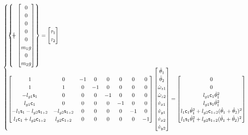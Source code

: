 \documentclass[a4paper,11pt,brazil,fleqn]{article}
\begin{document}
\begin{equation}
\begin{cases}
\begin{Bmatrix}
\begin{bmatrix}
\end{bmatrix}
+
\begin{bmatrix}
0 \\
0 \\
0 \\
0 \\
0 \\
m_1 g \\
0 \\
m_2 g
\end{bmatrix}
\end{Bmatrix}
=
\begin{bmatrix}
\tau_1 \\ \tau_2
\end{bmatrix} \\
\begin{bmatrix}
1 & 0 & -1 & 0 & 0 & 0 & 0 & 0 \\
1 & 1 & 0 & -1 & 0 & 0 & 0 & 0 \\
-l_{g1} \mathsf{s}_1 & 0 & 0 & 0 & -1 & 0 & 0 & 0 \\
 l_{g1} \mathsf{c}_1 & 0 & 0 & 0 & 0 & -1 & 0 & 0 \\
-l_{1} \mathsf{s}_1  - l_{g2} \mathsf{s}_{1{\scriptscriptstyle +} 2} & - l_{g2} \mathsf{s}_{1{\scriptscriptstyle +} 2} & 0 & 0 & 0 & 0 & -1 & 0 \\
 l_{1} \mathsf{c}_1  + l_{g2} \mathsf{c}_{1{\scriptscriptstyle +} 2} &   l_{g2} \mathsf{c}_{1{\scriptscriptstyle +} 2} & 0 & 0 & 0 & 0 & 0 & -1 \\
\end{bmatrix}
\begin{bmatrix}
\ddot{\theta}_1 \\
\ddot{\theta}_2 \\
\dot{\omega}_{z1} \\
\dot{\omega}_{z2} \\
\dot{v}_{x1} \\
\dot{v}_{y1} \\
\dot{v}_{x2} \\
\dot{v}_{y2} \\
\end{bmatrix} = 
\begin{bmatrix}
0 \\
0 \\
l_{g1} \mathsf{c}_1 \dot{\theta}_1^2 \\
l_{g1} \mathsf{s}_1 \dot{\theta}_1^2 \\
l_{1} \mathsf{c}_1 \dot{\theta}_1^2  + l_{g2} \mathsf{c}_{1{\scriptscriptstyle +} 2}  (\dot{\theta}_1+\dot{\theta}_2)^2 \\
l_{1} \mathsf{s}_1  \dot{\theta}_1^2 + l_{g2} \mathsf{s}_{1{\scriptscriptstyle +} 2}   (\dot{\theta}_1+\dot{\theta}_2)^2 \\
\end{bmatrix}
\end{cases}
\end{equation}\normalsize
\end{document}
